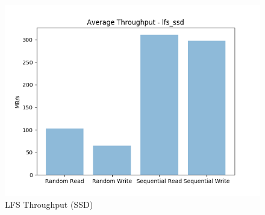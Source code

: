 \documentclass[10pt, author, twocolumn]{article}
\begin{document}
\begin{figure}[t!]
    \includegraphics[scale=0.5]{../graphs/lfs_ssd-thru.png}
    \caption{LFS Throughput (SSD)}
    \label{fig:ssd_lfs_thru}
\end{figure}



\end{document}
